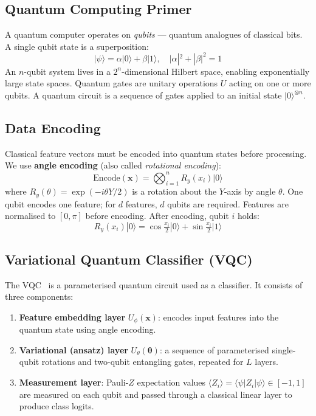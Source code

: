 \documentclass[12pt, a4paper]{article}
\newcommand{\vect}[1]{\boldsymbol{#1}}
\newcommand{\ket}[1]{|#1\rangle}
\newcommand{\bra}[1]{\langle #1|}
\begin{document}
\subsection{Quantum Computing Primer}

A quantum computer operates on \emph{qubits} — quantum analogues of classical
bits. A single qubit state is a superposition:
\begin{equation}
    \ket{\psi} = \alpha\ket{0} + \beta\ket{1}, \quad |\alpha|^2 + |\beta|^2 = 1
\end{equation}
An $n$-qubit system lives in a $2^n$-dimensional Hilbert space, enabling
exponentially large state spaces. Quantum gates are unitary operations $U$
acting on one or more qubits. A quantum circuit is a sequence of gates applied
to an initial state $\ket{0}^{\otimes n}$.

\subsection{Data Encoding}

Classical feature vectors must be encoded into quantum states before processing.
We use \textbf{angle encoding} (also called \emph{rotational encoding}):
\begin{equation}
    \text{Encode}(\vect{x}) = \bigotimes_{i=1}^{n} R_y(x_i) \ket{0}
\end{equation}
where $R_y(\theta) = \exp(-i\theta Y/2)$ is a rotation about the $Y$-axis
by angle $\theta$. One qubit encodes one feature; for $d$ features, $d$ qubits
are required. Features are normalised to $[0, \pi]$ before encoding.
After encoding, qubit $i$ holds:
\begin{equation}
    R_y(x_i)\ket{0} = \cos\!\tfrac{x_i}{2}\ket{0} + \sin\!\tfrac{x_i}{2}\ket{1}
\end{equation}

\subsection{Variational Quantum Classifier (VQC)}
\label{sec:vqc}

The VQC~\cite{schuld2020circuit} is a parameterised quantum circuit used
as a classifier. It consists of three components:

\begin{enumerate}
    \item \textbf{Feature embedding layer} $U_\phi(\vect{x})$: encodes input
          features into the quantum state using angle encoding.
    \item \textbf{Variational (ansatz) layer} $U_\theta(\vect{\theta})$: a
          sequence of parameterised single-qubit rotations and two-qubit
          entangling gates, repeated for $L$ layers.
    \item \textbf{Measurement layer}: Pauli-$Z$ expectation values
          $\langle Z_i \rangle = \bra{\psi}Z_i\ket{\psi} \in [-1, 1]$
          are measured on each qubit and passed through a classical linear
          layer to produce class logits.
\end{enumerate}
\end{document}
